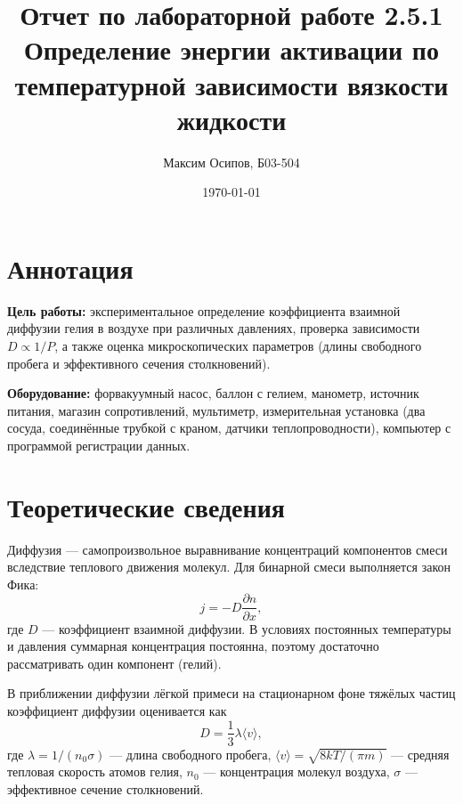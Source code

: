 \documentclass[a4paper, 12pt]{article}
\title{Отчет по лабораторной работе 2.5.1 \\ Определение энергии активации по температурной зависимости вязкости жидкости}
\author{Максим Осипов, Б03-504}
\date{\today}
\begin{document}
\maketitle

\section{Аннотация}
\textbf{Цель работы:} экспериментальное определение коэффициента взаимной диффузии гелия в воздухе при различных давлениях, проверка зависимости $D \propto 1/P$, а также оценка микроскопических параметров (длины свободного пробега и эффективного сечения столкновений).

\textbf{Оборудование:} форвакуумный насос, баллон с гелием, манометр, источник питания, магазин сопротивлений, мультиметр, измерительная установка (два сосуда, соединённые трубкой с краном, датчики теплопроводности), компьютер с программой регистрации данных.

\section{Теоретические сведения}
Диффузия --- самопроизвольное выравнивание концентраций компонентов смеси вследствие теплового движения молекул. Для бинарной смеси выполняется закон Фика:
\begin{equation}
    j = -D \frac{\partial n}{\partial x},
\end{equation}
где $D$ --- коэффициент взаимной диффузии. В условиях постоянных температуры и давления суммарная концентрация постоянна, поэтому достаточно рассматривать один компонент (гелий).

В приближении диффузии лёгкой примеси на стационарном фоне тяжёлых частиц коэффициент диффузии оценивается как
\begin{equation}
    D = \frac{1}{3} \lambda \langle v \rangle,
\end{equation}
где $\lambda = 1/(n_0 \sigma)$ --- длина свободного пробега, $\langle v \rangle = \sqrt{8kT/(\pi m)}$ --- средняя тепловая скорость атомов гелия, $n_0$ --- концентрация молекул воздуха, $\sigma$ --- эффективное сечение столкновений.
\end{document}
